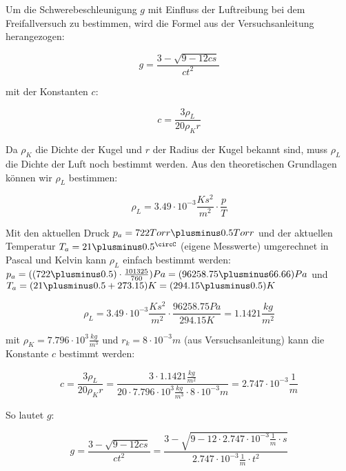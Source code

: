 \documentclass{protokoll}
\begin{document}
Um die Schwerebeschleunigung $g$ mit Einfluss der Luftreibung bei dem Freifallversuch zu bestimmen,
wird die Formel aus der Versuchsanleitung herangezogen:


\begin{equation}
g = \frac{3 - \sqrt{9 - 12cs}}{ct^2}
\end{equation}




mit der Konstanten $c$:


\begin{equation}
c = \frac{3 \rho_L}{20 \rho_K r}
\end{equation}




Da $\rho_K$ die Dichte der Kugel und $r$ der Radius der Kugel bekannt sind,
muss $\rho_L$ die Dichte der Luft noch bestimmt werden. Aus den theoretischen Grundlagen
können wir $\rho_L$ bestimmen:


\begin{equation}
\rho_L = 3.49\cdot 10^{-3} \frac{Ks^2}{m^2}\cdot \frac{p}{T}
\end{equation}




Mit den aktuellen Druck $p_a = 722 Torr \plusminus 0.5 Torr$ und der aktuellen Temperatur
$T_a = 21 \plusminus 0.5 ^\circC$ (eigene Messwerte) umgerechnet in Pascal und Kelvin kann $\rho_L$
einfach bestimmt werden: $p_a = ((722 \plusminus 0.5)\cdot \frac{101325}{760}) Pa = (96258.75 \plusminus 66.66) Pa$ 
und $T_a = (21 \plusminus 0.5 + 273.15) K = (294.15 \plusminus 0.5) K$


\begin{equation}
 \rho_L = 3.49\cdot 10^{-3} \frac{Ks^2}{m^2}\cdot \frac{96258.75 Pa}{294.15 K} = 1.1421 \frac{kg}{m^2}
\end{equation}




mit $\rho_K = 7.796\cdot 10^3 \frac{kg}{m^3}$ und $ r_k = 8\cdot 10^{-3} m$ (aus Versuchsanleitung)
kann die Konstante $c$ bestimmt werden:


\begin{equation}
c = \frac{3 \rho_L}{20 \rho_K r} = \frac{3\cdot 1.1421 \frac{kg}{m^2}}{20\cdot 7.796\cdot 10^3 \frac{kg}{m^3}\cdot 8\cdot 10^{-3} m}
= 2.747\cdot 10^{-3} \frac{1}{m}
\end{equation}




So lautet $g$:


\begin{equation}
g = \frac{3 - \sqrt{9 - 12cs}}{ct^2} = \frac{3 - \sqrt{9 - 12\cdot 2.747\cdot 10^{-3} \frac{1}{m}\cdot s}}{2.747\cdot 10^{-3} \frac{1}{m}\cdot t^2}
\end{equation}
\end{document}
